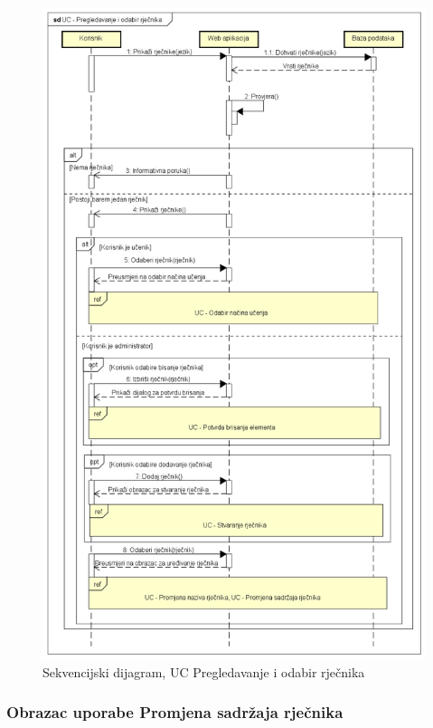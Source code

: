 \begin{figure}[p]
	\includegraphics[scale=0.5]{dijagrami/UC - Pregledavanje i odabir rjecnika.png} 
	\centering
	\caption{Sekvencijski dijagram, UC Pregledavanje i odabir rječnika}
	\label{fig:uc-odabir-rjecnika}
\end{figure}


\subsubsection{{Obrazac uporabe Promjena sadržaja rječnika}}

